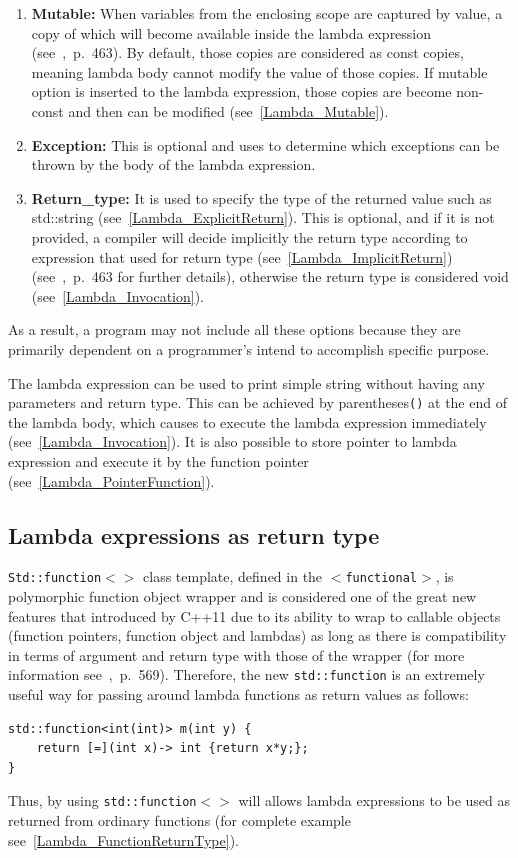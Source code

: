 \documentclass[11pt]{report}
\begin{document}
\begin{enumerate}
\item \textbf{Mutable:} When variables from the enclosing scope are captured by value, a copy of which will become available inside the lambda expression (see~\cite{Cppreference:2012:Cpp11},~p.~463). By default, those copies are considered as const copies, meaning lambda body cannot modify the value of those copies. If mutable option is inserted to the lambda expression, those copies are become non-const and then can be modified (see~\ref{Lambda_Mutable}).

\item \textbf{Exception:} This is optional and uses to determine which exceptions can be thrown by the body of the lambda expression.

\item \textbf{Return\_type:} It is used to specify the type of the returned value such as std::string (see~\ref{Lambda_ExplicitReturn}). This is optional, and if it is not provided, a compiler will decide implicitly the return type according to expression that used for return type (see~\ref{Lambda_ImplicitReturn}) (see~\cite{Cppreference:2012:Cpp11},~p.~463 for further details), otherwise the return type is considered void (see~\ref{Lambda_Invocation}).
\end{enumerate}

As a result, a program may not include all these options because they are primarily dependent on a programmer's intend to accomplish specific purpose.

The lambda expression can be used to print simple string without having any parameters and return type. This can be achieved by parentheses\texttt{()} at the end of the lambda body, which causes to execute the lambda expression immediately (see~\ref{Lambda_Invocation}). It is also possible to store pointer to lambda expression and execute it by the function pointer (see~\ref{Lambda_PointerFunction}).

\subsection{Lambda expressions as return type}
\label{subsection: Lambda Expressions as Return Type}
\texttt{Std::function$<>$} class template, defined in the \texttt{$<$functional$>$}, is polymorphic function object wrapper and is considered one of the great new features that introduced by C++11 due to its ability to wrap to callable objects (function pointers, function object and lambdas) as long as there is compatibility in terms of argument and return type with those of the wrapper (for more information see~\cite{Gregorie:professionalcpp},~p.~569). Therefore, the new \texttt{std::function} is an extremely useful way for passing around lambda functions as return values as follows:
\begin{lstlisting}
std::function<int(int)> m(int y) {
    return [=](int x)-> int {return x*y;};
}
\end{lstlisting}
Thus, by using \texttt{std::function$<>$} will allows lambda expressions to be used as returned from ordinary functions (for complete example see~\ref{Lambda_FunctionReturnType}).
\end{document}
